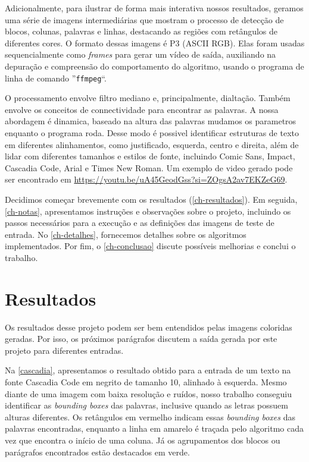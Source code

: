\documentclass[english, 
               brazil, 
               bsc] %
               {dcomp-abntex2}
\begin{document}
Adicionalmente, para ilustrar de forma mais interativa nossos resultados, geramos uma série de imagens intermediárias que mostram o processo de detecção de blocos, colunas, palavras e linhas, destacando as regiões com retângulos de diferentes cores. O formato dessas imagens é P3 (ASCII RGB). Elas foram usadas sequencialmente como \textit{frames} para gerar um vídeo de saída, auxiliando na depuração e compreensão do comportamento do algoritmo, usando o programa de linha de comando ''\texttt{ffmpeg}``.

O processamento envolve filtro mediano e, principalmente, dialtação. Também envolve os conceitos de connectividade para encontrar as palavras. A nossa abordagem é dinamica, baseado na altura das palavras mudamos os parametros enquanto o programa roda. Desse modo é possivel identificar estruturas de texto em diferentes alinhamentos, como justificado, esquerda, centro e direita, além de lidar com diferentes tamanhos e estilos de fonte, incluindo Comic Sans, Impact, Cascadia Code, Arial e Times New Roman. Um exemplo de video gerado pode ser encontrado em \url{https://youtu.be/uA45GeodGss?si=ZOgsA2av7EKZeG69}.

Decidimos começar brevemente com os resultados (\autoref{ch-resultados}). Em seguida, \autoref{ch-notas}, apresentamos instruções e observações sobre o projeto, incluindo os passos necessários para a execução e as definições das imagens de teste de entrada. No \autoref{ch-detalhes}, fornecemos detalhes sobre os algoritmos implementados. Por fim, o \autoref{ch-conclusao} discute possíveis melhorias e conclui o trabalho.



\chapter{Resultados} \label{ch-resultados}
Os resultados desse projeto podem ser bem entendidos pelas imagens coloridas geradas. Por isso, os próximos parágrafos discutem a saída gerada por este projeto para diferentes entradas.

Na \autoref{cascadia}, apresentamos o resultado obtido para a entrada de um texto na fonte Cascadia Code em negrito de tamanho 10, alinhado à esquerda. Mesmo diante de uma imagem com baixa resolução e ruídos, nosso trabalho conseguiu identificar as \textit{bounding boxes} das palavras, inclusive quando as letras possuem alturas diferentes. Os retângulos em vermelho indicam essas \textit{bounding boxes} das palavras encontradas, enquanto a linha em amarelo é traçada pelo algoritmo cada vez que encontra o início de uma coluna. Já os agrupamentos dos blocos ou parágrafos encontrados estão destacados em verde.
\end{document}
